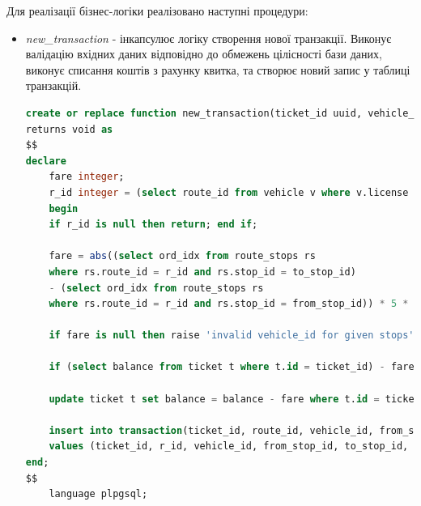 \documentclass[oneside,14pt]{extarticle}
\begin{document}
Для реалізації бізнес-логіки реалізовано наступні процедури:
\begin{itemize}
\item \textit{new\_transaction} - інкапсулює логіку створення нової транзакції. Виконує валідацію вхідних даних відповідно до обмежень цілісності бази даних, виконує списання коштів з рахунку квитка, та створює новий запис у таблиці транзакцій.
{\fontsize{8pt}{8pt}\selectfont\begin{lstlisting}[language=sql]
create or replace function new_transaction(ticket_id uuid, vehicle_id character varying(16), from_stop_id integer, to_stop_id integer)
returns void as
$$
declare
	fare integer;
	r_id integer = (select route_id from vehicle v where v.license = vehicle_id);
	begin
	if r_id is null then return; end if;

	fare = abs((select ord_idx from route_stops rs
	where rs.route_id = r_id and rs.stop_id = to_stop_id)
	- (select ord_idx from route_stops rs
	where rs.route_id = r_id and rs.stop_id = from_stop_id)) * 5 * coalesce((select mult from ticket_discount_mult d where d.discount = (select discount from ticket t where t.id = ticket_id)), 1);
	
	if fare is null then raise 'invalid vehicle_id for given stops'; end if;
	
	if (select balance from ticket t where t.id = ticket_id) - fare < 0 then raise 'not enough balance'; end if;
	
	update ticket t set balance = balance - fare where t.id = ticket_id;

	insert into transaction(ticket_id, route_id, vehicle_id, from_stop_id, to_stop_id, fare, timestamp)
	values (ticket_id, r_id, vehicle_id, from_stop_id, to_stop_id, fare, now());
end;
$$
	language plpgsql;
\end{lstlisting}}
\end{itemize}
\end{document}
